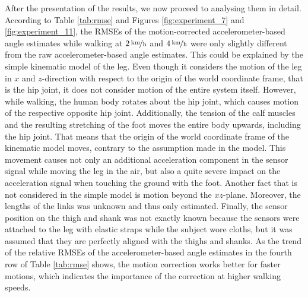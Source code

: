 After the presentation of the results, we now proceed to analysing them in detail. According to Table \ref{tab:rmse} and Figures \ref{fig:experiment_7} and \ref{fig:experiment_11}, the RMSEs of the motion-corrected accelerometer-based angle estimates while walking at $\unitfrac[2]{km}{h}$ and $\unitfrac[4]{km}{h}$ were only slightly different from the raw accelerometer-based angle estimates. This could be explained by the simple kinematic model of the leg. Even though it considers the motion of the leg in $x$ and $z$-direction with respect to the origin of the world coordinate frame, that is the hip joint, it does not consider motion of the entire system itself. However, while walking, the human body rotates about the hip joint, which causes motion of the respective opposite hip joint. Additionally, the tension of the calf muscles and the resulting stretching of the foot moves the entire body upwards, including the hip joint. That means that the origin of the world coordinate frame of the kinematic model moves, contrary to the assumption made in the model. This movement causes not only an additional acceleration component in the sensor signal while moving the leg in the air, but also a quite severe impact on the acceleration signal when touching the ground with the foot. Another fact that is not considered in the simple model is motion beyond the $xz$-plane. Moreover, the lengths of the links was unknown and thus only estimated. Finally, the sensor position on the thigh and shank was not exactly known because the sensors were attached to the leg with elastic straps while the subject wore cloths, but it was assumed that they are perfectly aligned with the thighs and shanks. As the trend of the relative RMSEs of the accelerometer-based angle estimates in the fourth row of Table \ref{tab:rmse} shows, the motion correction works better for faster motions, which indicates the importance of the correction at higher walking speeds. 

